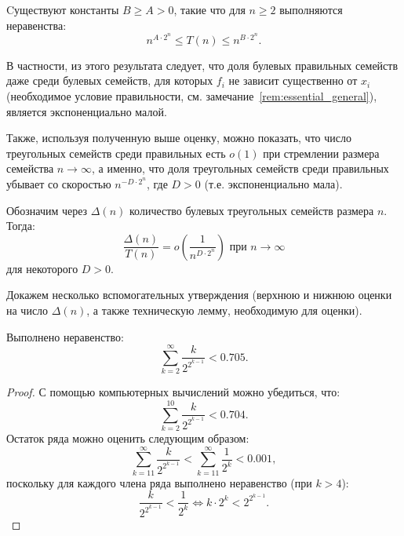     \begin{proposition}
    \label{thm:num_of_proper}
        Cуществуют константы $B \ge A > 0$, такие что для $n \ge 2$ выполняются неравенства:
        \[ 
            n^{A \cdot 2^n} \le T(n) \le n^{B \cdot 2^n}.
        \]
    \end{proposition}

    В частности, из этого результата следует, что доля булевых правильных семейств даже среди булевых семейств, для которых $f_i$ не зависит существенно от $x_i$ (необходимое условие правильности, см. замечание~\ref{rem:essential_general}), является экспоненциально малой.

    Также, используя полученную выше оценку, можно показать, что число треугольных семейств среди правильных есть $o(1)$ при стремлении размера семейства $n \to \infty$, а именно, что доля треугольных семейств среди правильных убывает со скоростью ${n^{-D \cdot 2^n}}$, где $D > 0$ (т.е. экспоненциально мала).

    \begin{theorem}%
    \label{thm:triangle}
        Обозначим через $\Delta(n)$ количество булевых треугольных семейств размера $n$.
        Тогда:
        \[
            \frac{\Delta(n)}{T(n)} = o \left(\frac{1}{n^{D \cdot 2^n}} \right)
            \text{ при } n \to \infty
        \]
        для некоторого $D > 0$.
    \end{theorem}

    Докажем несколько вспомогательных утверждения (верхнюю и нижнюю оценки на число $\Delta(n)$, а также техническую лемму, необходимую для оценки).

    \begin{lemma}%
    \label{lemma:seriessum}
        Выполнено неравенство:
        \[
            \sum_{k=2}^{\infty} \frac{k}{2^{2^{k-1}}} < 0.705.
        \]
    \end{lemma}

    \begin{proof}
        С помощью компьютерных вычислений можно убедиться, что: 
        \[
            \sum_{k=2}^{10} \frac{k}{2^{2^{k-1}}} < 0.704.
        \]
        Остаток ряда можно оценить следующим образом:
        \[
            \sum_{k=11}^{\infty} \frac{k}{2^{2^{k-1}}} < \sum_{k=11}^{\infty} \frac{1}{2^k} < 0.001,
        \]
        поскольку для каждого члена ряда выполнено неравенство (при $k>4$):
        \[
            \frac{k}{2^{2^{k-1}}} < \frac{1}{2^k} 
            \Leftrightarrow
            k \cdot 2^k < 2^{2^{k-1}}.
        \]
    \end{proof}



